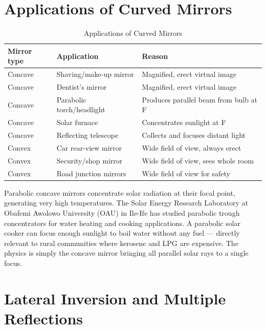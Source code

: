 \section{Applications of Curved Mirrors}

\begin{table}[H]
\centering
\caption{Applications of Curved Mirrors}
\label{tab:mirror_applications}
\begin{tabular}{lll}
\toprule
\textbf{Mirror type} & \textbf{Application} &
\textbf{Reason}\\
\midrule
Concave & Shaving/make-up mirror &
  Magnified, erect virtual image\\
Concave & Dentist's mirror &
  Magnified, erect virtual image\\
Concave & Parabolic torch/headlight &
  Produces parallel beam from bulb at F\\
Concave & Solar furnace &
  Concentrates sunlight at F\\
Concave & Reflecting telescope &
  Collects and focuses distant light\\
Convex & Car rear-view mirror &
  Wide field of view, always erect\\
Convex & Security/shop mirror &
  Wide field of view, sees whole room\\
Convex & Road junction mirrors &
  Wide field of view for safety\\
\bottomrule
\end{tabular}
\end{table}

\begin{realworldbox}
Parabolic concave mirrors concentrate solar radiation
at their focal point, generating very high temperatures.
The Solar Energy Research Laboratory at Obafemi Awolowo
University (OAU) in Ile-Ife has studied parabolic
trough concentrators for water heating and cooking
applications. A parabolic solar cooker can focus enough
sunlight to boil water without any fuel --- directly
relevant to rural communities where kerosene and LPG
are expensive. The physics is simply the concave
mirror bringing all parallel solar rays to a single
focus.
\end{realworldbox}

\section{Lateral Inversion and Multiple Reflections}

